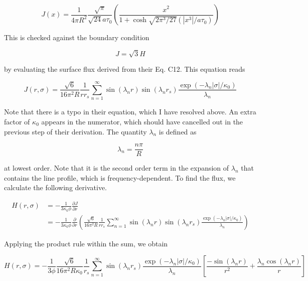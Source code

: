 \documentclass[onecolumn]{aastex63}
\begin{document}
\begin{equation} \label{c17/4piR^2}
    J(x) = \frac{1}{4\pi R^2}\frac{\sqrt{\pi}}{\sqrt{24}a\tau_0}\left(\frac{x^2}{1 + \cosh{\sqrt{2\pi^3/27}(|x^3|/a\tau_0)}}\right)
\end{equation}

This is checked against the boundary condition

\begin{equation} \label{bc}
    J = \sqrt{3} H
\end{equation}

by evaluating the surface flux derived from their Eq. C12. This equation reads 

\begin{equation} \label{c12}
    J(r, \sigma) = \frac{\sqrt{6}}{16 \pi^2 R} \frac{1}{rr_s} \sum_{n=1}^{\infty}\sin(\lambda_n r) \sin(\lambda_n r_s) \frac{\exp{(-\lambda_n |\sigma|/\kappa_0)}}{\lambda_n}
\end{equation}

Note that there is a typo in their equation, which I have resolved above. An extra factor of $\kappa_0$ appears in the numerator, which should have cancelled out in the previous step of their derivation. The quantity $\lambda_n$ is defined as 

\begin{equation} \label{lambdan}
    \lambda_n = \frac{n\pi}{R}
\end{equation}

at lowest order. Note that it is the second order term in the expansion of $\lambda_n$ that contains the line profile, which is frequency-dependent. To find the flux, we calculate the following derivative.

\begin{equation}
    \begin{split}
    H(r, \sigma) &= - \frac{1}{3\kappa_0 \phi}\frac{\partial J}{\partial r}\\
    &= - \frac{1}{3\kappa_0 \phi}\frac{\partial}{\partial r}\left(\frac{\sqrt{6}}{16 \pi^2 R} \frac{1}{rr_s} \sum_{n=1}^{\infty}\sin(\lambda_n r) \sin(\lambda_n r_s) \frac{\exp{(-\lambda_n |\sigma|/\kappa_0)}}{\lambda_n}\right)
    \end{split}
\end{equation}

Applying the product rule within the sum, we obtain

\begin{equation}
    H(r, \sigma) = - \frac{1}{3 \phi} \frac{\sqrt{6}}{16 \pi^2 R \kappa_0} \frac{1}{r_s} \sum_{n=1}^{\infty} \sin(\lambda_n r_s) \frac{\exp{(-\lambda_n |\sigma|/\kappa_0)}}{\lambda_n} \left[ \frac{-\sin(\lambda_n r)}{r^2} + \frac{\lambda_n \cos(\lambda_n r)}{r}\right]
\end{equation}
\end{document}
